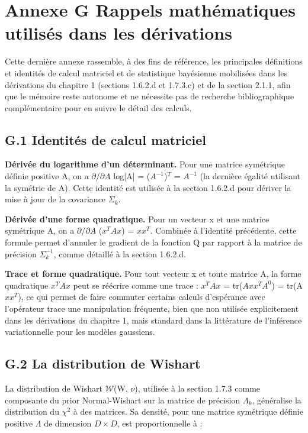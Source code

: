 \section*{Annexe G  Rappels mathématiques utilisés dans les dérivations}
Cette dernière annexe rassemble, à des fins de référence, les principales définitions et identités de calcul matriciel et de statistique bayésienne mobilisées dans les dérivations du chapitre 1 (sections 1.6.2.d et 1.7.3.c) et de la section 2.1.1, afin que le mémoire reste autonome et ne nécessite pas de recherche bibliographique complémentaire pour en suivre le détail des calculs.

\subsection*{G.1 Identités de calcul matriciel}
\textbf{Dérivée du logarithme d'un déterminant. }Pour une matrice symétrique définie positive A, on a $\partial $/$\partial A$ log|A| = ($A^{-1}$)$^{T}$ = $A^{-1}$ (la dernière égalité utilisant la symétrie de A). Cette identité est utilisée à la section 1.6.2.d pour dériver la mise à jour de la covariance $\Sigma _{k}$.

\textbf{Dérivée d'une forme quadratique. }Pour un vecteur x et une matrice symétrique A, on a $\partial $/$\partial A$ ($x^{T}Ax$) = $xx^{T}$. Combinée à l'identité précédente, cette formule permet d'annuler le gradient de la fonction Q par rapport à la matrice de précision $\Sigma _{k}^{-1}$, comme détaillé à la section 1.6.2.d.

\textbf{Trace et forme quadratique. }Pour tout vecteur x et toute matrice A, la forme quadratique $x^{T}Ax$ peut se réécrire comme une trace : $x^{T}Ax$ = tr($Axx^{T}A^{0}$) = tr(A $xx^{T}$), ce qui permet de faire commuter certains calculs d'espérance avec l'opérateur trace  une manipulation fréquente, bien que non utilisée explicitement dans les dérivations du chapitre 1, mais standard dans la littérature de l'inférence variationnelle pour les modèles gaussiens.

\subsection*{G.2 La distribution de Wishart}
La distribution de Wishart $\mathcal{W}$(W, $\nu $), utilisée à la section 1.7.3 comme composante du prior Normal-Wishart sur la matrice de précision $\Lambda _{k}$, généralise la distribution du $\chi ^{2}$ à des matrices. Sa densité, pour une matrice symétrique définie positive $\Lambda $ de dimension $D\times D$, est proportionnelle à :

